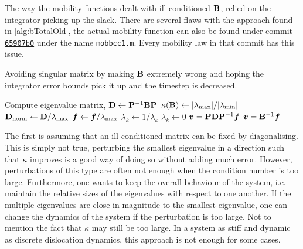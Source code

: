 The way the mobility functions dealt with ill-conditioned $\mathbf{B}$, relied on the integrator picking up the slack. There are several flaws with the approach found in \cref{alg:bTotalOld}, the actual mobility function can also be found under commit \href{https://github.com/TarletonGroup/EasyDD/blob/65907b022d1fe408fc1b2e5c5ca2bd1797ccae04/mobbcc1.m#L68}{\texttt{65907b0}} under the name \texttt{mobbcc1.m}. Every mobility law in that commit has this issue.
\begin{algorithm}
    \caption[Bad way of avoiding drag matrix inversion singularity.]{Avoiding singular matrix by making $\mathbf{B}$ extremely wrong and hoping the integrator error bounds pick it up and the timestep is decreased.}
    \label{alg:bTotalOld}
    \begin{algorithmic}
        \State Compute eigenvalue matrix, $\mathbf{D} \gets \mathbf{P}^{-1} \mathbf{B} \mathbf{P}$
        \State $\kappa(\mathbf{B}) \gets \lvert \lambda_{\textrm{max}} \rvert/ \lvert \lambda_{\textrm{min}} \rvert$
        \State $\mathbf{D}_{\textrm{norm}} \gets \mathbf{D} / \lambda_{\textrm{max}}$
        \State $\vec{f} \gets \vec{f} / \lambda_{\rvar{max}}$
        \State $\lambda_k \gets 1/\lambda_k$
        \Else
        \State $\lambda_k \gets 0$
        \EndIf
        \EndFor
        \State $\vec{v} = \mtx{P} \mtx{D} \mtx{P}^{-1} \vec{f}$
        \Else
        \State $\vec{v} = \mtx{B}^{-1} \vec{f}$
        \EndIf
    \end{algorithmic}
\end{algorithm}

The first is assuming that an ill-conditioned matrix can be fixed by diagonalising. This is simply not true, perturbing the smallest eigenvalue in a direction such that $\kappa$ improves is a good way of doing so without adding much error. However, perturbations of this type are often not enough when the condition number is too large. Furthermore, one wants to keep the overall behaviour of the system, i.e. maintain the relative sizes of the eigenvalues with respect to one another. If the multiple eigenvalues are close in magnitude to the smallest eigenvalue, one can change the dynamics of the system if the perturbation is too large. Not to mention the fact that $\kappa$ may still be too large. In a system as stiff and dynamic as discrete dislocation dynamics, this approach is not enough for some cases.

